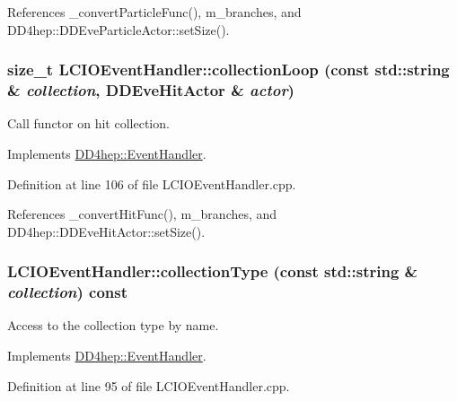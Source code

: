 References \_\-convertParticleFunc(), m\_\-branches, and DD4hep::DDEveParticleActor::setSize().\hypertarget{class_d_d4hep_1_1_l_c_i_o_event_handler_adbb8d55fec6962d692f19730fc5224fb}{
\subsubsection[{collectionLoop}]{\setlength{\rightskip}{0pt plus 5cm}size\_\-t LCIOEventHandler::collectionLoop (const std::string \& {\em collection}, \/  {\bf DDEveHitActor} \& {\em actor})}}
\label{class_d_d4hep_1_1_l_c_i_o_event_handler_adbb8d55fec6962d692f19730fc5224fb}


Call functor on hit collection. 

Implements \hyperlink{class_d_d4hep_1_1_event_handler_a454baeb81b675f3ebd8bb4293064b787}{DD4hep::EventHandler}.

Definition at line 106 of file LCIOEventHandler.cpp.

References \_\-convertHitFunc(), m\_\-branches, and DD4hep::DDEveHitActor::setSize().\hypertarget{class_d_d4hep_1_1_l_c_i_o_event_handler_a1bcb144db3e2bb4b5cfe9d54a6824211}{
\subsubsection[{collectionType}]{ LCIOEventHandler::collectionType (const std::string \& {\em collection}) const}}
\label{class_d_d4hep_1_1_l_c_i_o_event_handler_a1bcb144db3e2bb4b5cfe9d54a6824211}


Access to the collection type by name. 

Implements \hyperlink{class_d_d4hep_1_1_event_handler_a8424ffc2056b0e23d69c81ab2496cd51}{DD4hep::EventHandler}.

Definition at line 95 of file LCIOEventHandler.cpp.


